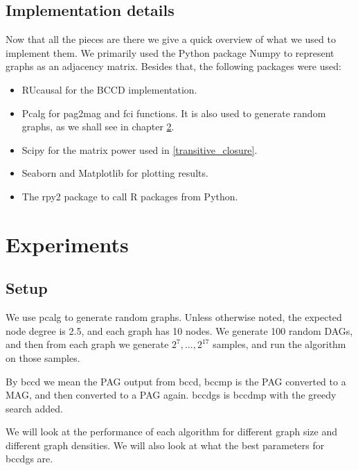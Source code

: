 \documentclass[11pt,a4paper]{report}
\begin{document}
\section{Implementation details}
Now that all the pieces are there we give a quick overview of what we used
to implement them. We primarily used the Python package Numpy
\cite{harrisArrayProgrammingNumPy2020} to represent graphs as an adjacency
matrix. Besides that, the following packages were used:
\begin{itemize}
  \item RUcausal  for the BCCD implementation.

  \item Pcalg\cite{kalischCausalInferenceUsing2012} for pag2mag and fci
    functions. It is also used to generate random graphs, as we shall see
    in chapter \ref{results}.

  \item Scipy\cite{virtanenSciPyFundamentalAlgorithms2020} for the matrix
    power used in \ref{transitive_closure}.

  \item Seaborn\cite{waskomSeabornStatisticalData2021} and
    Matplotlib\cite{hunterMatplotlib2DGraphics2007} for plotting results.

  \item The rpy2 package to call R packages from Python.
\end{itemize}

\chapter{Experiments}\label{results}

\section{Setup}
We use pcalg to generate random graphs. Unless otherwise noted, the
expected node degree is 2.5, and each graph has 10 nodes. We generate 100
random DAGs, and then from each graph we generate $2^7, \ldots, 2^{17}$
samples, and run the algorithm on those samples.

By bccd we mean the PAG output from bccd, bccmp is the PAG converted to a
MAG, and then converted to a PAG again. bccdgs is bccdmp with the greedy
search added.

We will look at the performance of each algorithm for different graph
size and different graph densities. We will also look at what the best
parameters for bccdgs are.
\end{document}
